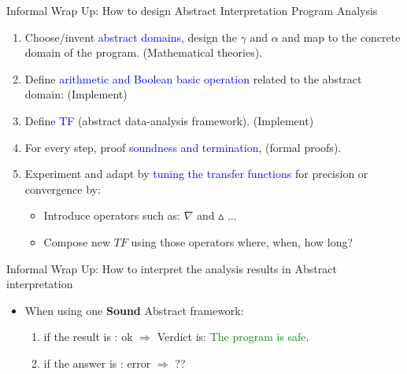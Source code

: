 \begin{frame}{Informal Wrap Up: How to design Abstract Interpretation Program Analysis}
\begin{enumerate}
	\item Choose/invent \textcolor{blue}{abstract domains}, design the $\gamma$ and $\alpha$ and map to the concrete domain of the program. (Mathematical theories).
	\item Define \textcolor{blue}{arithmetic and Boolean  basic operation} related to the abstract domain:  (Implement)
	\item Define  \textcolor{blue}{TF} (abstract data-analysis framework). (Implement)
	\item For every step, proof \textcolor{blue}{soundness and termination}, (formal proofs).
	\item Experiment and adapt by \textcolor{blue}{tuning the transfer functions} for precision or convergence by: 
	\begin{itemize}
		\item Introduce operators such as: $\nabla$ and  $\vartriangle$ ...
		\item Compose new $TF$ using those operators where, when, how long?
	\end{itemize}
	\end{enumerate}
\end{frame}

\begin{frame}{Informal Wrap Up: How to interpret the analysis results in Abstract interpretation}
\begin{itemize}
	\item When using one \textbf{Sound} Abstract framework:
	\begin{enumerate}
		\item if the result is : ok $\Rightarrow$ Verdict is: \textcolor{green}{The program is safe}.
		\item if the answer is : error $\Rightarrow$ ??
	\end{enumerate}	

\end{itemize}
\end{frame}

